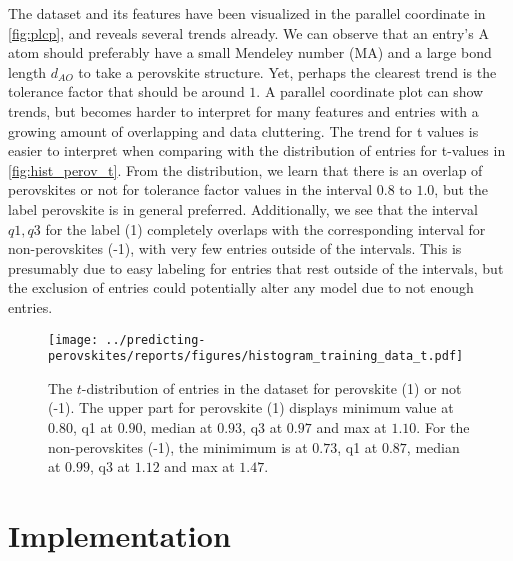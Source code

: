 \noindent The dataset and its features have been visualized in the parallel coordinate \cite{Inselberg1985} in \autoref{fig:plcp}, and reveals several trends already. We can observe that an entry's A atom should preferably have a small Mendeley number (MA) and a large bond length $d_{AO}$ to take a perovskite structure. Yet, perhaps the clearest trend is the tolerance factor that should be around $1$. A parallel coordinate plot can show trends, but becomes harder to interpret for many features and entries with a growing amount of overlapping and data cluttering. The trend for t values is easier to interpret when comparing with the distribution of entries for t-values in \autoref{fig:hist_perov_t}. From the distribution, we learn that there is an overlap of perovskites or not for tolerance factor values in the interval $0.8$ to $1.0$, but the label perovskite is in general preferred. Additionally, we see that the interval ${q1,q3}$ for the label (1) completely overlaps with the corresponding interval for non-perovskites (-1), with very few entries outside of the intervals. This is presumably due to easy labeling for entries that rest outside of the intervals, but the exclusion of entries could potentially alter any model due to not enough entries. %

\begin{figure}[ht!]
  \centering
  \texttt{[image: ../predicting-perovskites/reports/figures/histogram\_training\_data\_t.pdf]}
  \vspace*{-130mm}
  \caption{The $t$-distribution of entries in the dataset for perovskite (1) or not (-1). The upper part for perovskite (1) displays minimum value at $0.80$, q1 at $0.90$, median at $0.93$, q3 at $0.97$ and max at $1.10$. For the non-perovskites (-1), the minimimum is at $0.73$, q1 at $0.87$, median at $0.99$, q3 at $1.12$ and max at $1.47$.}
  \label{fig:hist_perov_t}
\end{figure}

\section{Implementation}



